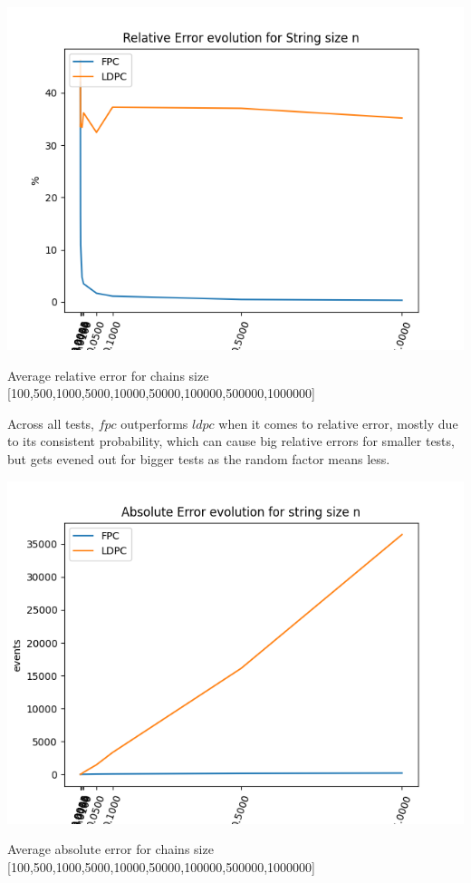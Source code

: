 \documentclass[...]{revdetua}
\begin{document}
\begin{table}[H]
\includegraphics[scale=0.5]{relative_error_big.png}
\caption{Average relative error for chains size [100,500,1000,5000,10000,50000,100000,500000,1000000]}
\end{table}
Across all tests, $fpc$ outperforms $ldpc$ when it comes to relative error, mostly due to its consistent probability, which can cause big relative errors for smaller tests, but gets evened out for bigger tests as the random factor means less.\par
\begin{table}[H]
\includegraphics[scale=0.5]{absolute_error_big.png}
\caption{Average absolute error for chains size [100,500,1000,5000,10000,50000,100000,500000,1000000]}
\end{table}
\end{document}
